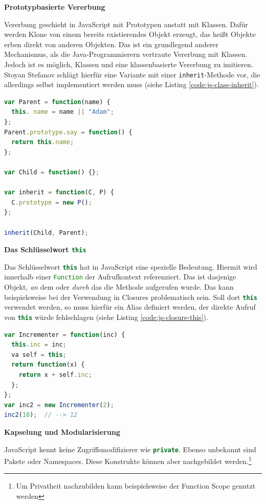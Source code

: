 \documentclass[a4paper, 12pt, hidelinks, listof=totoc, listoftables=totoc, bibliography=totoc]{scrreprt}
\newcommand{\code}[1]{\lstinline[language=Scala, style=inline]|#1|}
\newcommand{\js}[1]{\lstinline[language=JavaScript, style=inline]|#1|}
\newcommand{\MyMiniSec}[1]{\rmfamily\fontsize{12}{15}\selectfont
	\vspace{7pt}\textbf{#1} %
}
\begin{document}
\MyMiniSec{Prototypbasierte Vererbung}

Vererbung geschieht in JavaScript mit Prototypen anstatt mit Klassen. Dafür werden Klone von einem bereits existierendes Objekt erzeugt, das heißt Objekte erben direkt von anderen Objekten. Das ist ein grundlegend anderer Mechanismus, als die Java-Programmierern vertraute Vererbung mit Klassen. Jedoch ist es möglich, Klassen und eine klassenbasierte Vererbung zu imitieren. Stoyan Stefanov schlägt hierfür eine Variante mit einer \js{inherit}-Methode vor, die allerdings selbst implementiert werden muss (siehe Listing \ref{code:js-class-inherit}).

\begin{lstlisting}[language=JavaScript, caption={[Vererbungsmuster mit Klassen in JavaScript.] Vererbungsmuster mit Klassen in JavaScript. \protect\cite[Basierend auf:][S. 16 f.]{stefanov2010.JSP} }, label={code:js-class-inherit}]
var Parent = function(name) {
  this. name = name || "Adam";
};
Parent.prototype.say = function() {
  return this.name;
};

var Child = function() {};

var inherit = function(C, P) {
  C.prototype = new P();
};

inherit(Child, Parent);
\end{lstlisting}


\MyMiniSec{Das Schlüsselwort \js{this}}

Das Schlüsselwort \js{this} hat in JavaScript eine spezielle Bedeutung. Hiermit wird innerhalb einer \js{Function} der Aufrufkontext referenziert. Das ist dasjenige Objekt, \emph{an} dem oder \emph{durch} das die Methode aufgerufen wurde. 
\cite[199 ff.]{flanagan2011.JDG} Das kann beispielsweise bei der Verwendung in Closures problematisch sein. Soll dort \js{this} verwendet werden, so muss hierfür ein Alias definiert werden, der direkte Aufruf von \js{this} würde fehlschlagen (siehe Listing \ref{code:js-closure-this}).

\begin{lstlisting}[language=JavaScript, style=snippet, caption={Die Verwendung von \js{this} in JavaScript-Closures.}, label={code:js-closure-this}]
var Incrementer = function(inc) {
  this.inc = inc;
  va self = this;
  return function(x) {
    return x + self.inc;
  };
};
var inc2 = new Incrementer(2);
inc2(10);  // --> 12
\end{lstlisting}


\MyMiniSec{Kapselung und Modularisierung}

JavaScript kennt keine Zugriffsmodifizierer wie \code{private}. Ebenso unbekannt sind Pakete oder Namespaces. Diese Konstrukte können aber nachgebildet werden.\footnote{Um Privatheit nachzubilden kann beispielsweise der Function Scope genutzt werden}
\end{document}
